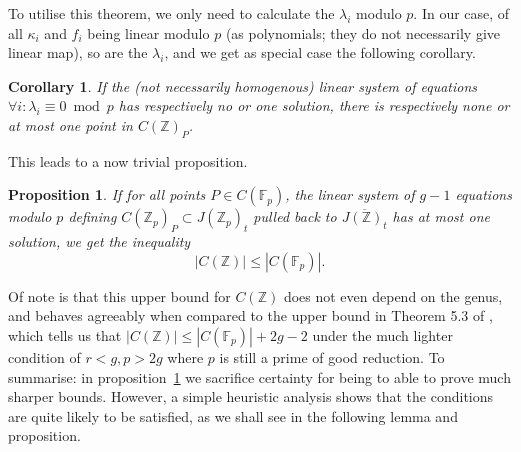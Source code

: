 \documentclass[12pt]{article}
\newcommand{\Z}{\mathbb{Z}}
\newcommand{\F}{\mathbb{F}}
\theoremstyle{plain}
\newtheorem{cor}[thm]{Corollary} %
\newtheorem{prop}[thm]{Proposition} %
\theoremstyle{definition}
\theoremstyle{remark}
\begin{document}
To utilise this theorem, we only need to calculate the $\lambda_i$ modulo $p$. In our case, of all $\kappa_i$ and $f_i$ being linear modulo $p$ (as polynomials; they do not necessarily give linear map), so are the $\lambda_i$, and we get as special case the following corollary.
\begin{cor}
\label{cor:finedixlinear}
If the (not necessarily homogenous) linear system of equations $\forall i: \lambda_i \equiv 0 \bmod p$ has respectively no or one solution, there is respectively none or at most one point in $C(\Z)_P$.
\end{cor}

This leads to a now trivial proposition.
\begin{prop}
\label{prop:linchabauty}
If for all points $P \in C(\F_p)$, the linear system of $g-1$ equations modulo $p$ defining $C(\Z_p)_P \subset J(\Z_p)_t$ pulled back to $\overline{J(\Z)_t}$ has at most one solution, we get the inequality
\[
|C(\Z)| \leq |C(\F_p)|.
\]
\end{prop}

Of note is that this upper bound for $C(\Z)$ does not even depend on the genus, and behaves agreeably when compared to the upper bound in Theorem 5.3 of \cite{poonen12}, which tells us that $|C(\Z)| \leq |C(\F_p)| + 2g-2$ under the much lighter condition of $r < g, p > 2g$ where $p$ is still a prime of good reduction. To summarise: in proposition~\ref{prop:linchabauty} we sacrifice certainty for being to able to prove much sharper bounds. However, a simple heuristic analysis shows that the conditions are quite likely to be satisfied, as we shall see in the following lemma and proposition.
\end{document}
